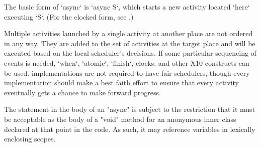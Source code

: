 The basic form of \xcd`async` is \xcd`async S`, which starts a new activity
located \xcd`here` executing \xcd`S`.   (For the clocked form, see
.)  



Multiple activities launched by a single activity at another place are not
ordered in any way. They are added to the set of activities at the target
place and will be executed based on the local scheduler's decisions.
If some particular sequencing of events is needed, \xcd`when`, \xcd`atomic`,
\xcd`finish`, clocks, and other X10 constructs can be used.
\Xten{} implementations are not required to have fair schedulers,
though every implementation should make a best faith effort to ensure
that every activity eventually gets a chance to make forward progress.

\begin{staticrule*}
The statement in the body of an \xcd"async" is subject to the
restriction that it must be acceptable as the body of a \xcd"void"
method for an anonymous inner class declared at that point in the code. As
such, it may reference variables in lexically enclosing scopes.
\end{staticrule*}

